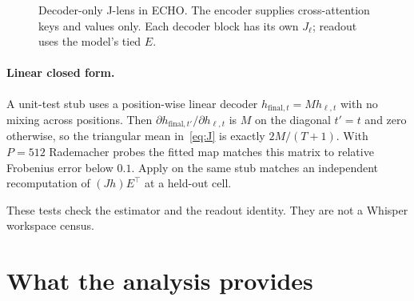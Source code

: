 \documentclass[conference]{IEEEtran}
\begin{document}
\begin{figure}[!t]
\centering
{}
\caption{Decoder-only J-lens in ECHO. The encoder supplies cross-attention keys and values only. Each decoder block has its own \(J_\ell\); readout uses the model's tied \(E\).}
\label{fig:arch}
\end{figure}

\paragraph{Linear closed form.}
A unit-test stub uses a position-wise linear decoder \(h_{\mathrm{final},t}=M h_{\ell,t}\) with no mixing across positions. Then \(\partial h_{\mathrm{final},t'}/\partial h_{\ell,t}\) is \(M\) on the diagonal \(t'=t\) and zero otherwise, so the triangular mean in~\eqref{eq:J} is exactly \(2M/(T+1)\). With \(P=512\) Rademacher probes the fitted map matches this matrix to relative Frobenius error below \(0.1\). Apply on the same stub matches an independent recomputation of \((J h)E^\top\) at a held-out cell.

These tests check the estimator and the readout identity. They are not a Whisper workspace census.

\section{What the analysis provides}
\end{document}
